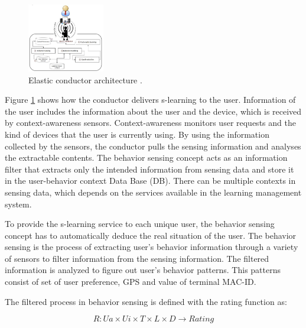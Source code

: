 \documentclass[journal]{vgtc}
\begin{document}
  \begin{figure}[t]
    \centering
    \includegraphics[width=0.3\textwidth]{elastic-conductor}
    \caption{Elastic conductor architecture \cite{Kim2013}.}
    \label{elastic-conductor}
  \end{figure}

  Figure \ref{elastic-conductor} shows how the conductor delivers s-learning to the user. Information of the user includes the information about the user and the device, which is received by context-awareness sensors. Context-awareness monitors user requests and the kind of devices that the user is currently using. By using the information collected by the sensors, the conductor pulls the sensing information and analyses the extractable contents. The behavior sensing concept acts as an information filter that extracts only the intended information from sensing data and store it in the user-behavior context Data Base (DB). There can be multiple contexts in sensing data, which depends on the services available in the learning management system.

  To provide the s-learning service to each unique user, the behavior sensing concept has to automatically deduce the real situation of the user. The behavior sensing is the process of extracting user's behavior information through a variety of sensors to filter information from the sensing information. The filtered information is analyzed to figure out user's behavior patterns. This patterns consist of set of user preference, GPS and value of terminal MAC-ID.


  The filtered process in behavior sensing is defined with the rating function as:

  \begin{equation}
    R: Ua \times Ui \times T \times L \times D \rightarrow Rating
  \end{equation}
\end{document}
